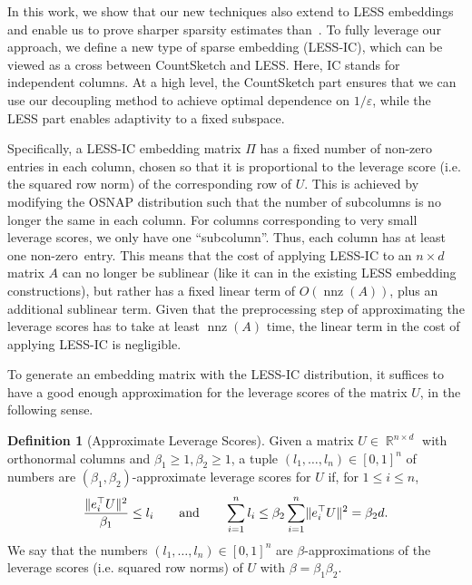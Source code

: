 \documentclass[11pt]{amsart}
\numberwithin{equation}{section}
\numberwithin{equation}{section}
\DeclareMathOperator{\R}{\mathbb{R}}
\DeclareMathOperator{\nnz}{nnz}
\DeclarePairedDelimiter{\norm}{\lVert}{\rVert}
\theoremstyle{remark}
\theoremstyle{definition}
\newtheorem{definition}[theorem]{Definition}
\begin{document}
In this work, we show that our new techniques  also extend to LESS embeddings and enable us to prove sharper sparsity estimates than~\cite{chenakkod2024optimal}. To fully leverage our approach, we define a new type of sparse embedding (LESS-IC), which can be viewed as a cross between CountSketch and LESS. Here, IC stands for independent columns. At a high level, the CountSketch part ensures that we can use our decoupling method to achieve optimal dependence on $1/\varepsilon$, while the LESS part enables adaptivity to a fixed subspace.

Specifically, a LESS-IC embedding matrix $\Pi$ has a fixed number of non-zero entries in each column, chosen so that it is proportional to the leverage score (i.e. the squared row norm) of the corresponding row of $U$. This is achieved by modifying the OSNAP distribution such that the number of subcolumns is no longer the same in each column. For columns corresponding to very small leverage scores, we only have one ``subcolumn''. Thus, each column has at least one non-zero~entry. This means that the cost of applying LESS-IC to an $n\times d$ matrix $A$ can no longer be sublinear (like it can in the existing LESS embedding constructions), but rather has a fixed linear term of $O(\nnz(A))$, plus an additional sublinear term. Given that the preprocessing step of approximating the leverage scores has to take at least $\nnz(A)$ time, the linear term in the cost of applying LESS-IC is negligible.

To generate an embedding matrix with the LESS-IC distribution, it suffices to have a good enough approximation for the leverage scores of the matrix $U$, in the following sense.

\begin{definition}[Approximate Leverage Scores]\label{def:apprls}
    Given a matrix $U\in\R^{n\times d}$ with orthonormal columns and $\beta_1 \ge 1, \beta_2 \ge 1$, a tuple $(l_1, \ldots, l_n) \in [0,1]^n$ of numbers are $(\beta_1,\beta_2)$-approximate leverage scores for $U$ if, for $1\leq i\leq n$,
    \begin{align*}
        \frac{\norm{e_i^\top U}^2}{\beta_1} \leq l_i \qquad\text{and}\qquad
    \sum_{i=1}^n l_i \leq \beta_2 \sum_{i=1}^n \norm{e_i^\top U}^2 = \beta_2 d.
    \end{align*}
    We say that the numbers $(l_1, \ldots, l_n) \in [0,1]^n$ are $\beta$-approximations of the leverage scores (i.e. squared row norms) of $U$ with $\beta=\beta_1\beta_2$.
\end{definition}
\end{document}
